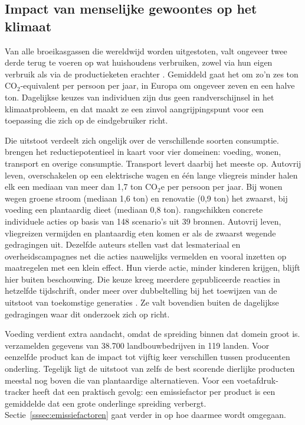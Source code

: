 \documentclass{hogent-article}
\begin{document}
    
    \subsection{Impact van menselijke gewoontes op het klimaat}
    \label{ssec:impactgewoontes}
    
    Van alle broeikasgassen die wereldwijd worden uitgestoten, valt ongeveer twee
    derde terug te voeren op wat huishoudens verbruiken, zowel via hun eigen
    verbruik als via de productieketen erachter \autocite{Ivanova2020}. Gemiddeld gaat het om zo'n zes ton CO$_2$-equivalent per
    persoon per jaar, in Europa om ongeveer zeven en een halve ton. Dagelijkse
    keuzes van individuen zijn dus geen randverschijnsel in het klimaatprobleem, en
    dat maakt ze een zinvol aangrijpingspunt voor een toepassing die zich op de
    eindgebruiker richt.
    
    Die uitstoot verdeelt zich ongelijk over de verschillende soorten consumptie.
    \textcite{Ivanova2020} brengen het reductiepotentieel in kaart voor vier
    domeinen: voeding, wonen, transport en overige consumptie. Transport levert
    daarbij het meeste op. Autovrij leven, overschakelen op een elektrische wagen en
    één lange vliegreis minder halen elk een mediaan van meer dan 1,7 ton
    CO$_2$e per persoon per jaar. Bij wonen wegen groene stroom (mediaan 1,6 ton) en
    renovatie (0,9 ton) het zwaarst, bij voeding een plantaardig dieet
    (mediaan 0,8 ton). \textcite{WynesNicholas2017} rangschikken
    concrete individuele acties op basis van 148 scenario's uit 39 bronnen.
    Autovrij leven, vliegreizen vermijden en plantaardig eten komen er als de
    zwaarst wegende gedragingen uit. Dezelfde auteurs stellen vast dat lesmateriaal
    en overheidscampagnes net die acties nauwelijks vermelden en vooral inzetten op
    maatregelen met een klein effect. Hun vierde actie, minder kinderen krijgen,
    blijft hier buiten beschouwing. Die keuze kreeg meerdere gepubliceerde reacties
    in hetzelfde tijdschrift, onder meer over dubbeltelling bij het toewijzen van de
    uitstoot van toekomstige generaties \autocite{VanBasshuysenBrandstedt2018}.
    Ze valt bovendien buiten de dagelijkse gedragingen waar dit onderzoek zich op
    richt.
    
    Voeding verdient extra aandacht, omdat de spreiding binnen dat domein groot is.
    \textcite{PooreNemecek2018} verzamelden gegevens van 38.700 landbouwbedrijven in
    119 landen. Voor eenzelfde product kan de impact tot vijftig keer verschillen
    tussen producenten onderling. Tegelijk ligt de uitstoot van zelfs de best
    scorende dierlijke producten meestal nog boven die van plantaardige
    alternatieven. Voor een voetafdruk-tracker heeft dat een praktisch gevolg: een
    emissiefactor per product is een gemiddelde dat een grote onderlinge spreiding
    verbergt. Sectie~\ref{sssec:emissiefactoren} gaat verder in op hoe daarmee wordt
    omgegaan.
    
\end{document}
